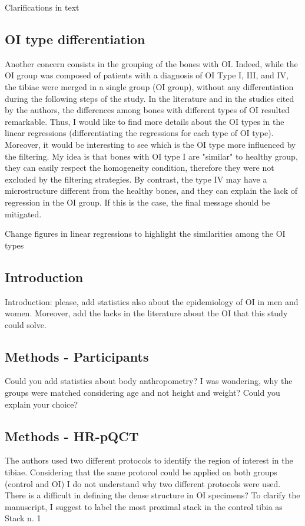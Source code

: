 \documentclass{AR2RC}
\begin{document}
\AR Clarifications in text

\subsection{OI type differentiation}

\RC Another concern consists in the grouping of the bones with OI. Indeed, while the OI group was composed of patients with a diagnosis of OI Type I, III, and IV, the tibiae were merged in a single group (OI group), without any differentiation during the following steps of the study. In the literature and in the studies cited by the authors, the differences among bones with different types of OI resulted remarkable. Thus, I would like to find more details about the OI types in the linear regressions (differentiating the regressions for each type of OI type). Moreover, it would be interesting to see which is the OI type more influenced by the filtering. My idea is that bones with OI type I are "similar" to healthy group, they can easily respect the homogeneity condition, therefore they were not excluded by the filtering strategies. By contrast, the type IV may have a microstructure different from the healthy bones, and they can explain the lack of regression in the OI group. If this is the case, the final message should be mitigated.

\AR Change figures in linear regressions to highlight the similarities among the OI types

\subsection{Introduction}
Introduction: please, add statistics also about the epidemiology of OI in men and women. Moreover, add the lacks in the literature about the OI that this study could solve.

\subsection{Methods - Participants}
Could you add statistics about body anthropometry? I was wondering, why the groups were matched considering age and not height and weight? Could you explain your choice?

\subsection{Methods - HR-pQCT}
The authors used two different protocols to identify the region of interest in the tibiae. Considering that the same protocol could be applied on both groups (control and OI) I do not understand why two different protocols were used. There is a difficult in defining the dense structure in OI specimens? To clarify the manuscript, I suggest to label the most proximal stack in the control tibia as Stack n. 1
\end{document}
